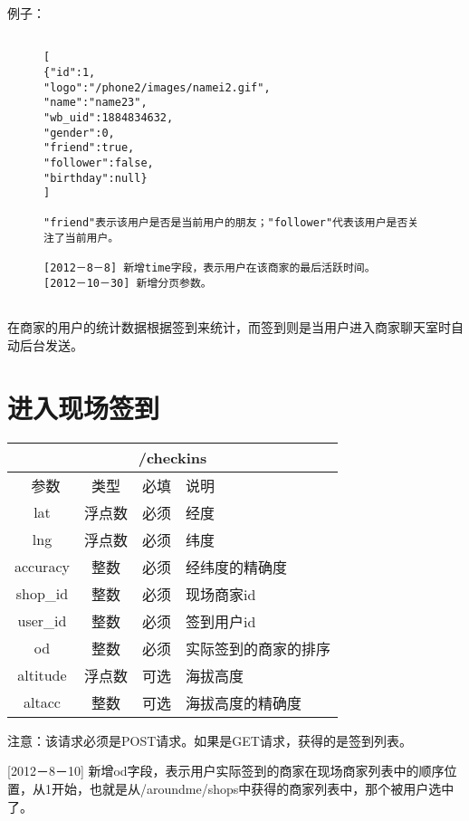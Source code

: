\documentclass[cs4size]{ctexartutf8}
\begin{document}
例子：

\begin{figure}[H]
\begin{verbatim}

[
{"id":1,
"logo":"/phone2/images/namei2.gif",
"name":"name23",
"wb_uid":1884834632,
"gender":0,
"friend":true,
"follower":false,
"birthday":null}
]

"friend"表示该用户是否是当前用户的朋友；"follower"代表该用户是否关注了当前用户。

[2012－8－8] 新增time字段，表示用户在该商家的最后活跃时间。
[2012－10－30] 新增分页参数。


\end{verbatim}
\end{figure}



在商家的用户的统计数据根据签到来统计，而签到则是当用户进入商家聊天室时自动后台发送。


\section{进入现场签到}

\begin{table}[H]
   \begin{center}
\begin{tabular}{|c|c|c|p{12cm}|}
\hline
\multicolumn{4}{|c|}{/checkins} \\
\hline\hline
 \  参数  & 类型 & 必填 &  说明  \\
\hline
 lat  & 浮点数 & 必须 & 经度\\
\hline
 lng  &  浮点数 & 必须 & 纬度\\ 
\hline
 accuracy  & 整数 & 必须 & 经纬度的精确度\\ 
\hline
 shop\_id  & 整数 & 必须 &  现场商家id\\ 
\hline
 user\_id  & 整数 & 必须 &  签到用户id\\ 
\hline
 od  & 整数 & 必须 &  实际签到的商家的排序\\  
\hline
 altitude  &  浮点数 & 可选 & 海拔高度\\ 
\hline
 altacc  & 整数 & 可选 & 海拔高度的精确度\\  
\hline
\end{tabular}
   \end{center}
\end{table}

注意：该请求必须是POST请求。如果是GET请求，获得的是签到列表。

[2012－8－10] 新增od字段，表示用户实际签到的商家在现场商家列表中的顺序位置，从1开始，也就是从/aroundme/shops中获得的商家列表中，那个被用户选中了。
\end{document}
